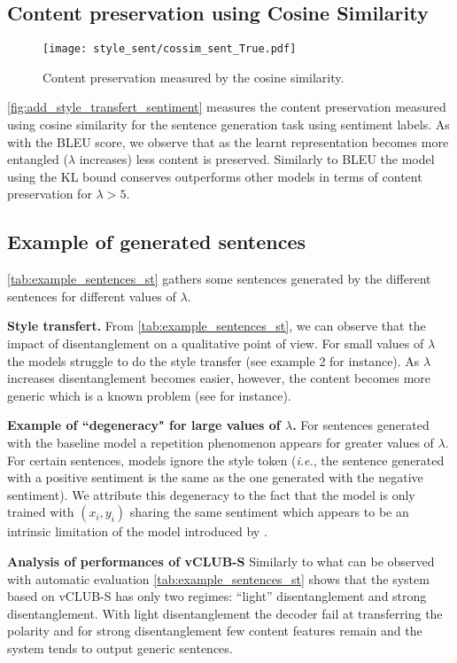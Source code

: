 \subsection{Content preservation using Cosine Similarity}
\begin{figure} 

\centering     \texttt{[image: style\_sent/cossim\_sent\_True.pdf]}
\caption{Content preservation measured by the cosine similarity. }\label{fig:add_style_transfert_sentiment}
\end{figure} 

\autoref{fig:add_style_transfert_sentiment} measures the content preservation measured using cosine similarity for the sentence generation task using sentiment labels. As with the BLEU score, we observe that as the learnt representation becomes more entangled ($\lambda$ increases) less content is preserved. Similarly to BLEU the model using the KL bound conserves outperforms other models in terms of content preservation for $\lambda > 5$.

\subsection{Example of generated sentences}
\autoref{tab:example_sentences_st} gathers some sentences generated by the different sentences for different values of $\lambda$. 

\textbf{Style transfert.} From \autoref{tab:example_sentences_st}, we can observe that the impact of disentanglement on a qualitative point of view. For small values of $\lambda$ the models struggle to do the style transfer (see example 2 for instance). As $\lambda$ increases disentanglement becomes easier, however, the content becomes more generic which is a known problem (see \cite{mmi} for instance). 



\textbf{Example of ``degeneracy" for large values of $\lambda$.} For sentences generated with the baseline model a repetition phenomenon appears for greater values of $\lambda$. For certain sentences, models ignore the style token (\textit{i.e.}, the sentence generated with a positive sentiment is the same as the one generated with the negative sentiment). We attribute this degeneracy to the fact that the model is only trained with $(x_i,y_i)$ sharing the same sentiment which appears to be an intrinsic limitation of the model introduced  by \cite{text}.

\textbf{Analysis of performances of vCLUB-S} Similarly to what can be observed with automatic evaluation \autoref{tab:example_sentences_st} shows that the system based on vCLUB-S has only two regimes: “light” disentanglement and strong disentanglement. With light disentanglement the decoder fail at transferring the polarity and for strong disentanglement few content features remain and the system tends to output generic sentences.

